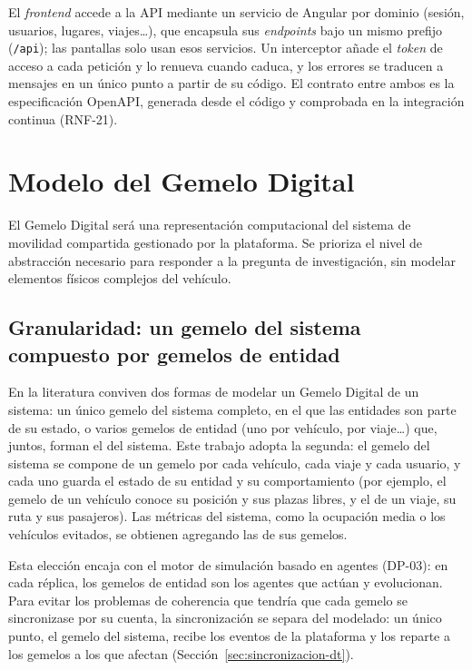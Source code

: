 El \textit{frontend} accede a la API mediante un servicio de Angular por dominio (sesión, usuarios, lugares, viajes\ldots), que encapsula sus \textit{endpoints} bajo un mismo prefijo (\texttt{/api}); las pantallas solo usan esos servicios. Un interceptor añade el \textit{token} de acceso a cada petición y lo renueva cuando caduca, y los errores se traducen a mensajes en un único punto a partir de su código. El contrato entre ambos es la especificación OpenAPI, generada desde el código y comprobada en la integración continua (RNF-21).

\section{Modelo del Gemelo Digital}
\label{sec:modelo-dt}

El Gemelo Digital será una representación computacional del sistema de movilidad compartida gestionado por la plataforma. Se prioriza el nivel de abstracción necesario para responder a la pregunta de investigación, sin modelar elementos físicos complejos del vehículo.

\subsection{Granularidad: un gemelo del sistema compuesto por gemelos de entidad}
\label{sec:granularidad-dt}

En la literatura conviven dos formas de modelar un Gemelo Digital de un sistema: un único gemelo del sistema completo, en el que las entidades son parte de su estado, o varios gemelos de entidad (uno por vehículo, por viaje\ldots) que, juntos, forman el del sistema. Este trabajo adopta la segunda: el gemelo del sistema se compone de un gemelo por cada vehículo, cada viaje y cada usuario, y cada uno guarda el estado de su entidad y su comportamiento (por ejemplo, el gemelo de un vehículo conoce su posición y sus plazas libres, y el de un viaje, su ruta y sus pasajeros). Las métricas del sistema, como la ocupación media o los vehículos evitados, se obtienen agregando las de sus gemelos.

Esta elección encaja con el motor de simulación basado en agentes (DP-03): en cada réplica, los gemelos de entidad son los agentes que actúan y evolucionan. Para evitar los problemas de coherencia que tendría que cada gemelo se sincronizase por su cuenta, la sincronización se separa del modelado: un único punto, el gemelo del sistema, recibe los eventos de la plataforma y los reparte a los gemelos a los que afectan (Sección~\ref{sec:sincronizacion-dt}).

